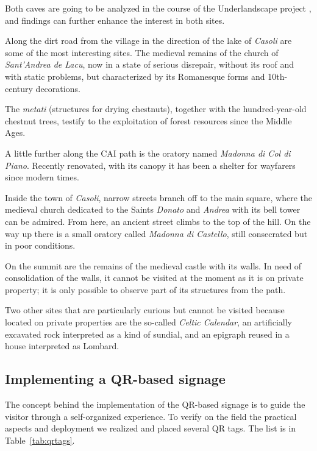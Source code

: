 \documentclass[sustainability,article,submit,pdftex,moreauthors]{Definitions/mdpi}
\begin{document}
Both caves are going to be analyzed in the course of the Underlandscape project , and findings can further enhance the interest in both sites.

Along the dirt road from the village in the direction of the lake of \emph{Casoli} are some of the most interesting sites. The medieval remains of the church of {\em Sant'Andrea de Lacu}, now in a state of serious disrepair, without its roof and with static problems, but characterized by its Romanesque forms and 10th-century decorations. 

The \emph{metati} (structures for drying chestnuts), together with the hundred-year-old chestnut trees, testify to the exploitation of forest resources since the Middle Ages. 

A little further along the CAI path is the oratory named {\em Madonna di Col di Piano}. Recently renovated, with its canopy it has been a shelter for wayfarers since modern times.

Inside the town of \emph{Casoli}, narrow streets branch off to the main square, where the medieval church dedicated to the Saints \emph{Donato} and \emph{Andrea} with its bell tower can be admired. From here, an ancient street climbs to the top of the hill. On the way up there is a small oratory called {\em Madonna di Castello}, still consecrated but in poor conditions. 

On the summit are the remains of the medieval castle with its walls. In need of consolidation of the walls, it cannot be visited at the moment as it is on private property; it is only possible to observe part of its structures from the path. 

Two other sites that are particularly curious but cannot be visited because located on private properties are the so-called  {\em Celtic Calendar}, an artificially excavated rock interpreted as a kind of sundial, and an epigraph reused in a house interpreted as Lombard.

\subsection{Implementing a QR-based signage}

The concept behind the implementation of the QR-based signage is to guide the visitor through a self-organized experience. To verify on the field the practical aspects and deployment we realized and placed several QR tags. The list is in Table~\ref{tab:qrtags}.
\end{document}
